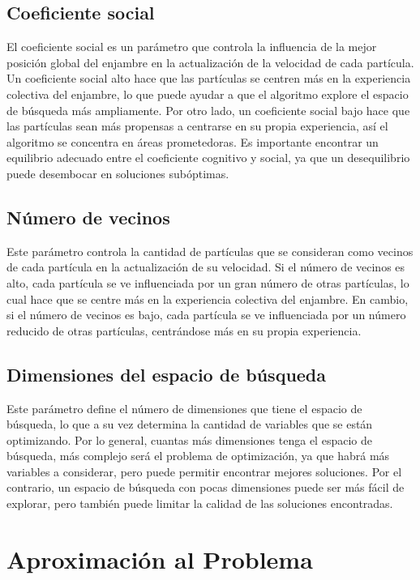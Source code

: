 \subsection{Coeficiente social}

El coeficiente social es un parámetro que controla la influencia de la mejor posición global del enjambre en la actualización de la velocidad de cada partícula. Un coeficiente social alto hace que las partículas se centren más en la experiencia colectiva del enjambre, lo que puede ayudar a que el algoritmo explore el espacio de búsqueda más ampliamente. Por otro lado, un coeficiente social bajo hace que las partículas sean más propensas a centrarse en su propia experiencia, así el algoritmo se concentra en áreas prometedoras. Es importante encontrar un equilibrio adecuado entre el coeficiente cognitivo y social, ya que un desequilibrio puede desembocar en soluciones subóptimas.

\subsection{Número de vecinos}

Este parámetro controla la cantidad de partículas que se consideran como vecinos de cada partícula en la actualización de su velocidad. Si el número de vecinos es alto, cada partícula se ve influenciada por un gran número de otras partículas, lo cual hace que se centre más en la experiencia colectiva del enjambre. En cambio, si el número de vecinos es bajo, cada partícula se ve influenciada por un número reducido de otras partículas, centrándose más en su propia experiencia. 

\subsection{Dimensiones del espacio de búsqueda}

Este parámetro define el número de dimensiones que tiene el espacio de búsqueda, lo que a su vez determina la cantidad de variables que se están optimizando. Por lo general, cuantas más dimensiones tenga el espacio de búsqueda, más complejo será el problema de optimización, ya que habrá más variables a considerar, pero puede permitir encontrar mejores soluciones. Por el contrario, un espacio de búsqueda con pocas dimensiones puede ser más fácil de explorar, pero también puede limitar la calidad de las soluciones encontradas. 

\section{Aproximación al Problema}

